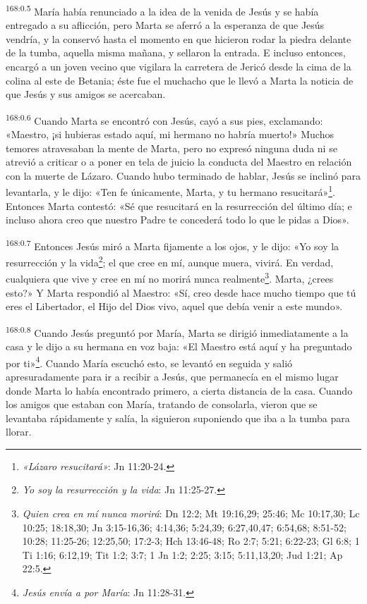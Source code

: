 \par
\textsuperscript{168:0.5} María había renunciado a la idea de la venida de Jesús y se había entregado a su aflicción, pero Marta se aferró a la esperanza de que Jesús vendría, y la conservó hasta el momento en que hicieron rodar la piedra delante de la tumba, aquella misma mañana, y sellaron la entrada. E incluso entonces, encargó a un joven vecino que vigilara la carretera de Jericó desde la cima de la colina al este de Betania; éste fue el muchacho que le llevó a Marta la noticia de que Jesús y sus amigos se acercaban.

\par
\textsuperscript{168:0.6} Cuando Marta se encontró con Jesús, cayó a sus pies, exclamando: «Maestro, ¡si hubieras estado aquí, mi hermano no habría muerto!» Muchos temores atravesaban la mente de Marta, pero no expresó ninguna duda ni se atrevió a criticar o a poner en tela de juicio la conducta del Maestro en relación con la muerte de Lázaro. Cuando hubo terminado de hablar, Jesús se inclinó para levantarla, y le dijo: «Ten fe únicamente, Marta, y tu hermano resucitará»\footnote{\textit{«Lázaro resucitará»}: Jn 11:20-24.}. Entonces Marta contestó: «Sé que resucitará en la resurrección del último día; e incluso ahora creo que nuestro Padre te concederá todo lo que le pidas a Dios».

\par
\textsuperscript{168:0.7} Entonces Jesús miró a Marta fijamente a los ojos, y le dijo: «Yo soy la resurrección y la vida\footnote{\textit{Yo soy la resurrección y la vida}: Jn 11:25-27.}; el que cree en mí, aunque muera, vivirá. En verdad, cualquiera que vive y cree en mí no morirá nunca realmente\footnote{\textit{Quien crea en mí nunca morirá}: Dn 12:2; Mt 19:16,29; 25:46; Mc 10:17,30; Lc 10:25; 18:18,30; Jn 3:15-16,36; 4:14,36; 5:24,39; 6:27,40,47; 6:54,68; 8:51-52; 10:28; 11:25-26; 12:25,50; 17:2-3; Hch 13:46-48; Ro 2:7; 5:21; 6:22-23; Gl 6:8; 1 Ti 1:16; 6:12,19; Tit 1:2; 3:7; 1 Jn 1:2; 2:25; 3:15; 5:11,13,20; Jud 1:21; Ap 22:5.}. Marta, ¿crees esto?» Y Marta respondió al Maestro: «Sí, creo desde hace mucho tiempo que tú eres el Libertador, el Hijo del Dios vivo, aquel que debía venir a este mundo».

\par
\textsuperscript{168:0.8} Cuando Jesús preguntó por María, Marta se dirigió inmediatamente a la casa y le dijo a su hermana en voz baja: «El Maestro está aquí y ha preguntado por ti»\footnote{\textit{Jesús envía a por María}: Jn 11:28-31.}. Cuando María escuchó esto, se levantó en seguida y salió apresuradamente para ir a recibir a Jesús, que permanecía en el mismo lugar donde Marta lo había encontrado primero, a cierta distancia de la casa. Cuando los amigos que estaban con María, tratando de consolarla, vieron que se levantaba rápidamente y salía, la siguieron suponiendo que iba a la tumba para llorar.


